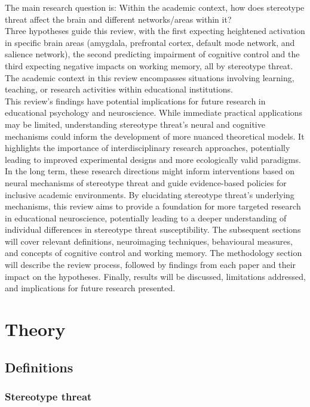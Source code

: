 \documentclass[
  stu, a4paper,floatsintext]{apa7}
\begin{document}
The main research question is: Within the academic context, how does stereotype threat affect the brain and different networks/areas within it?\\
Three hypotheses guide this review, with the first expecting heightened activation in specific brain areas (amygdala, prefrontal cortex, default mode network, and salience network), the second predicting impairment of cognitive control and the third expecting negative impacts on working memory, all by stereotype threat.\\
The academic context in this review encompasses situations involving learning, teaching, or research activities within educational institutions.\\
This review's findings have potential implications for future research in educational psychology and neuroscience. While immediate practical applications may be limited, understanding stereotype threat's neural and cognitive mechanisms could inform the development of more nuanced theoretical models. It highlights the importance of interdisciplinary research approaches, potentially leading to improved experimental designs and more ecologically valid paradigms.
In the long term, these research directions might inform interventions based on neural mechanisms of stereotype threat and guide evidence-based policies for inclusive academic environments. By elucidating stereotype threat's underlying mechanisms, this review aims to provide a foundation for more targeted research in educational neuroscience, potentially leading to a deeper understanding of individual differences in stereotype threat susceptibility.
The subsequent sections will cover relevant definitions, neuroimaging techniques, behavioural measures, and concepts of cognitive control and working memory. The methodology section will describe the review process, followed by findings from each paper and their impact on the hypotheses. Finally, results will be discussed, limitations addressed, and implications for future research presented.

\section{Theory}\label{theory}

\subsection{Definitions}\label{definitions}

\subsubsection{Stereotype threat}\label{stereotype-threat}
\end{document}
